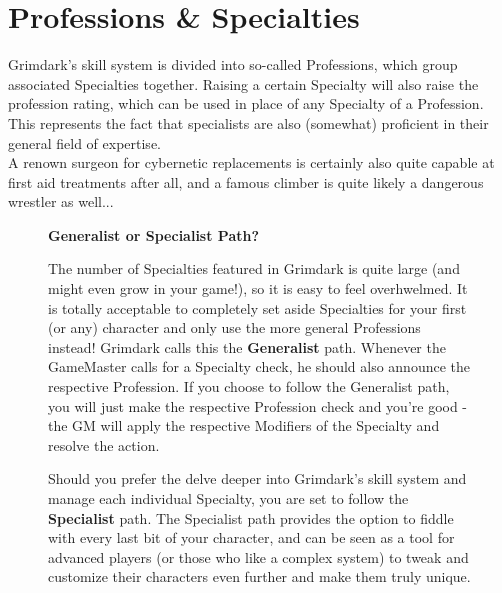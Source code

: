 \chapter{Professions \& Specialties}
Grimdark's skill system is divided into so-called Professions, which group associated Specialties together. Raising a certain Specialty will also raise the profession rating, which can be used in place of any Specialty of a Profession. 
This represents the fact that specialists are also (somewhat) proficient in their general field of expertise.\\
A renown surgeon for cybernetic replacements is certainly also quite capable at first aid treatments after all, and a famous climber is quite likely a dangerous wrestler as well...
\begin{figure}[ht]
	\begin{DndReadAloud}
	{\large\textbf{Generalist or Specialist Path?}}

	The number of Specialties featured in Grimdark is quite large (and might even grow in your game!), so it is easy to feel overhwelmed.
	It is totally acceptable to completely set aside Specialties for your first (or any) character and only use the more general Professions instead! Grimdark calls this the \textbf{Generalist} path.
	Whenever the GameMaster calls for a Specialty check, he should also announce the respective Profession.
	If you choose to follow the Generalist path, you will just make the respective Profession check and you're good - the GM will apply the respective Modifiers of the Specialty and resolve the action.

	Should you prefer the delve deeper into Grimdark's skill system and manage each individual Specialty, you are set to follow the \textbf{Specialist} path.
	The Specialist path provides the option to fiddle with every last bit of your character, and can be seen as a tool for advanced players (or those who like a complex system) to tweak and customize their characters even further and make them truly unique.
	\end{DndReadAloud}
\end{figure}

